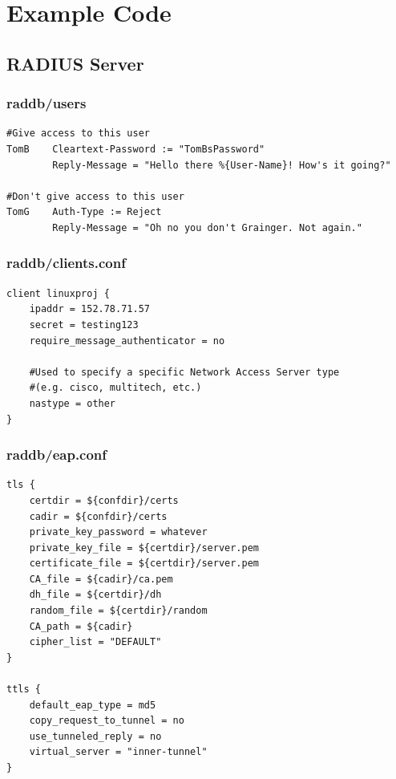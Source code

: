 \documentclass[12pt,a4paper,titlepage]{article}
\begin{document}
\newpage
\appendix
\section{Example Code}

\subsection{RADIUS Server}
\label{sec:Code;sub:radius}

\subsubsection{raddb/users}
\begin{Verbatim}[frame=single]
#Give access to this user
TomB    Cleartext-Password := "TomBsPassword"
        Reply-Message = "Hello there %{User-Name}! How's it going?"

#Don't give access to this user
TomG    Auth-Type := Reject
        Reply-Message = "Oh no you don't Grainger. Not again."
\end{Verbatim}

\subsubsection{raddb/clients.conf}
\begin{Verbatim}[frame=single]
client linuxproj {
    ipaddr = 152.78.71.57
    secret = testing123
    require_message_authenticator = no
    
    #Used to specify a specific Network Access Server type
    #(e.g. cisco, multitech, etc.)
    nastype = other
}
\end{Verbatim}

\subsubsection{raddb/eap.conf}
\begin{Verbatim}[frame=single]
tls {
    certdir = ${confdir}/certs
    cadir = ${confdir}/certs
    private_key_password = whatever
    private_key_file = ${certdir}/server.pem
    certificate_file = ${certdir}/server.pem
    CA_file = ${cadir}/ca.pem
    dh_file = ${certdir}/dh
    random_file = ${certdir}/random
    CA_path = ${cadir}
    cipher_list = "DEFAULT"
}

ttls {
    default_eap_type = md5
    copy_request_to_tunnel = no
    use_tunneled_reply = no
    virtual_server = "inner-tunnel"
}
\end{Verbatim}
\end{document}
